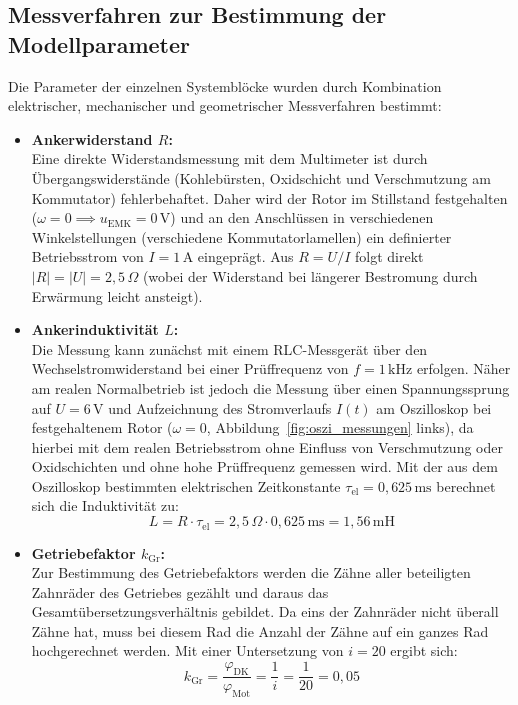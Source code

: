 \documentclass[a4paper,10pt,department=FakEI]{OTHRartcl}
\begin{document}
\subsection{Messverfahren zur Bestimmung der Modellparameter}
Die Parameter der einzelnen Systemblöcke wurden durch Kombination elektrischer, mechanischer und geometrischer Messverfahren bestimmt:
\begin{itemize}\setlength{\itemsep}{2pt}
    \item \textbf{Ankerwiderstand $R$:}\\
    Eine direkte Widerstandsmessung mit dem Multimeter ist durch Übergangswiderstände (Kohlebürsten, Oxidschicht und Verschmutzung am Kommutator) fehlerbehaftet. Daher wird der Rotor im Stillstand festgehalten ($\omega = 0 \implies u_{\text{EMK}} = 0\,\text{V}$) und an den Anschlüssen in verschiedenen Winkelstellungen (verschiedene Kommutatorlamellen) ein definierter Betriebsstrom von $I = 1\,\text{A}$ eingeprägt. Aus $R = U/I$ folgt direkt $|R| = |U| = 2{,}5\,\Omega$ (wobei der Widerstand bei längerer Bestromung durch Erwärmung leicht ansteigt).

    \item \textbf{Ankerinduktivität $L$:}\\
    Die Messung kann zunächst mit einem RLC-Messgerät über den Wechselstromwiderstand bei einer Prüffrequenz von $f = 1\,\text{kHz}$ erfolgen. Näher am realen Normalbetrieb ist jedoch die Messung über einen Spannungssprung auf $U = 6\,\text{V}$ und Aufzeichnung des Stromverlaufs $I(t)$ am Oszilloskop bei festgehaltenem Rotor ($\omega = 0$, Abbildung~\ref{fig:oszi_messungen} links), da hierbei mit dem realen Betriebsstrom ohne Einfluss von Verschmutzung oder Oxidschichten und ohne hohe Prüffrequenz gemessen wird. Mit der aus dem Oszilloskop bestimmten elektrischen Zeitkonstante $\tau_{\text{el}} = 0{,}625\,\text{ms}$ berechnet sich die Induktivität zu:
    \begin{equation}
        L = R \cdot \tau_{\text{el}} = 2{,}5\,\Omega \cdot 0{,}625\,\text{ms} = 1{,}56\,\text{mH}
    \end{equation}

    \item \textbf{Getriebefaktor $k_{\text{Gr}}$:}\\
    Zur Bestimmung des Getriebefaktors werden die Zähne aller beteiligten Zahnräder des Getriebes gezählt und daraus das Gesamtübersetzungsverhältnis gebildet. Da eins der Zahnräder nicht überall Zähne hat, muss bei diesem Rad die Anzahl der Zähne auf ein ganzes Rad  hochgerechnet werden. Mit einer Untersetzung von $i = 20$ ergibt sich:
    \begin{equation}
        k_{\text{Gr}} = \frac{\varphi_{\text{DK}}}{\varphi_{\text{Mot}}} = \frac{1}{i} = \frac{1}{20} = 0{,}05
    \end{equation}


\end{itemize}
\end{document}

